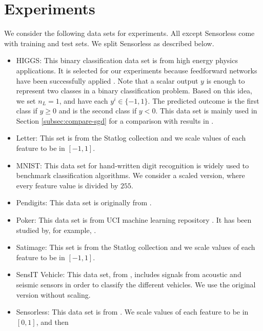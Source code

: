 \documentclass[12pt]{article}
\begin{document}
\section{Experiments}
\label{sec:deep-exps}
We consider the following data sets for experiments. All except {\sf Sensorless} come with training and test sets. We split {\sf Sensorless} as described below.
\begin{itemize}
\item
{\sf HIGGS}: This binary classification data set is from high energy physics applications. It is selected for our experiments because feedforward networks have been successfully applied \citep{PB14a}. 
Note that a scalar output $y$ is enough to represent two classes in a binary classification problem. Based on this idea, we set $n_L = 1$, and have each $y^i \in \{-1, 1\}$. 
The predicted outcome is the first class if $y \geq 0$ and is the second class if $y < 0$. This data set is mainly used in Section \ref{subsec:compare-sgd} for a comparison with results in \cite{PB14a}.
\item
{\sf Letter}: This set is from the Statlog collection \citep{DM94a} and we scale values of each feature to be in $[-1,1]$. 
\item
{\sf MNIST}: This data set for hand-written digit recognition \citep{YL98a} is widely used to benchmark classification algorithms.
We consider a scaled version, where every feature value is divided by $255$.
\item
{\sf Pendigits}: This data set is originally from \cite{FA96a}.
\item
{\sf Poker}: This data set is from UCI machine learning repository \citep{ML13a}. It has been studied by, for example, \cite{PL10c}.
\item
{\sf Satimage}: This set is from the Statlog collection \citep{DM94a} and we scale values of each feature to be in $[-1,1]$. 
\item
{\sf SensIT Vehicle}: This data set, from \cite{MD04a}, includes signals from acoustic and seismic sensors in order to classify the different vehicles.
We use the original version without scaling.
\item
{\sf Sensorless}: This data set is from \cite{FP13a}. We scale values of each feature to be in $[0,1]$, and then 

\end{itemize}
\end{document}
